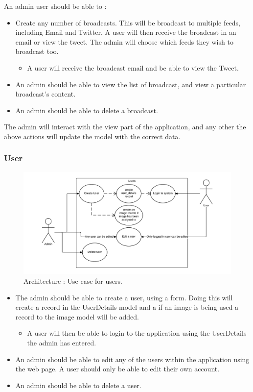 \documentclass[10pt,a4paper,titlepage]{article}
\begin{document}
An admin user should be able to :
\begin{itemize}
\item Create any number of broadcasts. This will be broadcast to multiple feeds, including Email and Twitter. A user will then receive the broadcast in an email or view the tweet. The admin will choose which feeds they wish to broadcast too.
	\begin{itemize}
	\item A user will receive the broadcast email and be able to view the Tweet. 
	\end{itemize}
\item An admin should be able to view the list of broadcast, and view a particular broadcast's content.
\item An admin should be able to delete a broadcast.
\end{itemize}
The admin will interact with the view part of the application, and any other the above actions will update the model with the correct data.

\subsubsection{User}
\begin{figure}[H]
\begin{center}
\includegraphics[scale=0.3]{include/User_Use_Case.png}  
\caption{Architecture : Use case for users. }
\label{fig:userUseCase}
\end{center}
\end{figure}

\begin{itemize}
\item The admin should be able to create a user, using a form. Doing this will create a record in the UserDetails model and a if an image is being used a record to the image model will be added. 
	\begin{itemize}
	\item A user will then be able to login to the application using the UserDetails the admin has entered.
	\end{itemize} 
\item An admin should be able to edit any of the users within the application using the web page. A user should only be able to edit their own account.
\item An admin should be able to delete a user.
\end{itemize}
\end{document}
